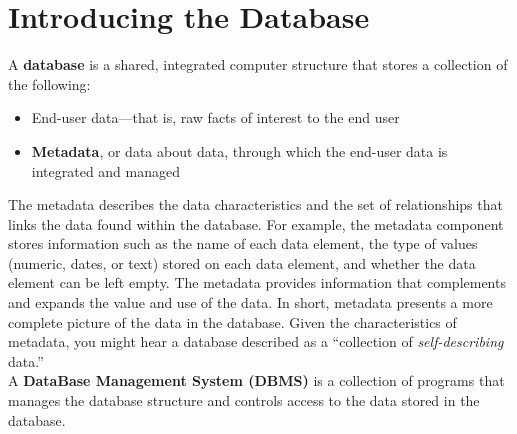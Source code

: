 \documentclass[a4paper, 12pt, titlepage]{report}
\begin{document}
\section{Introducing the Database}
A \textbf{database} is a shared, integrated computer structure that stores a collection of the following:
\begin{itemize}
\item End-user data—that is, raw facts of interest to the end user
\item \textbf{Metadata}, or data about data, through which the end-user data is integrated and managed
\end{itemize}
The metadata describes the data characteristics and the set of relationships that links the data found within the database. For example, the metadata component stores information such as the name of each data element, the type of values (numeric, dates, or text) stored on each data element, and whether the data element can be left empty. The metadata provides information that complements and expands the value and use of the data. In short, metadata presents a more complete picture of the data in the database. Given the characteristics of metadata, you might hear a database described as a “collection of \emph{self-describing} data.”\\
A \textbf{DataBase Management System (DBMS)} is a collection of programs that manages the database structure and controls access to the data stored in the database.
\end{document}
